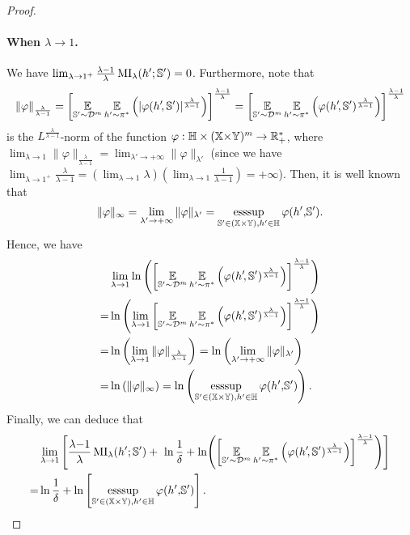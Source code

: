 \begin{noaddcontents}
\begin{proof}
\paragraph{When $\lambda\rightarrow 1$.} We have  $\lim_{\lambda\rightarrow 1^+}\frac{\lambda{-}1}{\lambda}\operatorname{MI}_{\lambda}(h'; \mathbb{S}') = 0$.
Furthermore, note that 
\begin{align*}
    \|\varphi\|_{\frac{\lambda}{\lambda{-}1}} = \left[\operatorname*{\mathbb{E}}_{\mathbb{S}'{\sim}\mathcal{D}^{m}}\operatorname*{\mathbb{E}}_{h'{\sim}\pi^*}\left(\vert\varphi(h'\!, \mathbb{S}')\vert^{\frac{\lambda}{\lambda{-}1}}\right)\right]^{\frac{\lambda{-}1}{\lambda}} = \left[\operatorname*{\mathbb{E}}_{\mathbb{S}'{\sim}\mathcal{D}^{m}}\operatorname*{\mathbb{E}}_{h'{\sim}\pi^*}\left(\varphi(h'\!, \mathbb{S}')^{\frac{\lambda}{\lambda{-}1}}\right)\right]^{\frac{\lambda{-}1}{\lambda}}
\end{align*}
is the $L^{\frac{\lambda}{\lambda{-}1}}$-norm of the function $\varphi: \mathbb{H}\times(\mathbb{X}{\times}\mathbb{Y})^m \rightarrow \mathbb{R}_{+}^*$, where $\lim_{\lambda\rightarrow 1} \|\varphi\|_{\frac{\lambda}{\lambda{-}1}} = \lim_{\lambda'\rightarrow +\infty} \|\varphi\|_{\lambda'}$ (since we have $\lim_{\lambda\rightarrow 1^+}\frac{\lambda}{\lambda{-}1} = (\lim_{\lambda\rightarrow1}\lambda)(\lim_{\lambda\rightarrow1}\frac{1}{\lambda{-}1}) = +\infty$).
Then, it is well known that
\begin{align*}
    \|\varphi\|_{\infty}= \lim_{\lambda'\rightarrow+\infty}\|\varphi\|_{\lambda'} = \operatorname*{\text{\rm esssup}}_{\mathbb{S}'\in(\mathbb{X}{\times}\mathbb{Y}), h'\in\mathbb{H}}\varphi(h'{,} \mathbb{S}').
\end{align*}
Hence, we have 
\begin{align*}
    &\lim_{\lambda\rightarrow1} \ln\left(\left[\operatorname*{\mathbb{E}}_{\mathbb{S}'{\sim}\mathcal{D}^{m}}\operatorname*{\mathbb{E}}_{h'{\sim}\pi^*}\left(\varphi(h'\!, \mathbb{S}')^{\frac{\lambda}{\lambda{-}1}}\right)\right]^{\frac{\lambda{-}1}{\lambda}}\right)\\
    = &\ln\left( \lim_{\lambda\rightarrow1} \left[\operatorname*{\mathbb{E}}_{\mathbb{S}'{\sim}\mathcal{D}^{m}}\operatorname*{\mathbb{E}}_{h'{\sim}\pi^*}\left(\varphi(h'\!, \mathbb{S}')^{\frac{\lambda}{\lambda{-}1}}\right)\right]^{\frac{\lambda{-}1}{\lambda}}\right)\\
    = &\ln\left( \lim_{\lambda\rightarrow1} \| \varphi\|_{\frac{\lambda}{\lambda-1}}\right) = \ln\left( \lim_{\lambda'\rightarrow+\infty} \| \varphi\|_{\lambda'}\right) \\
    = &\ln\left( \| \varphi\|_{\infty}\right) = \ln\left( \operatorname*{\text{\rm esssup}}_{\mathbb{S}'\in(\mathbb{X}{\times}\mathbb{Y}), h'\in\mathbb{H}}\varphi(h'{,} \mathbb{S}') \right).
\end{align*}
Finally, we can deduce that 
\begin{align*}
    &\lim_{\lambda\rightarrow 1}\LB \frac{\lambda{-}1}{\lambda}\MI_{\lambda}(\h'; \S') +\ \ln\frac{1}{\delta} + \ln\!\LP\LB\EE_{\S'{\sim}\D^{\m}}\EE_{\h'{\sim} \P^*}\LP\varphi(\h'\!, \S')^{\frac{\lambda}{\lambda-1}}\RP\RB^{\frac{\lambda{-}1}{\lambda}}\RP\RB\\
    = &\ln\frac{1}{\delta} + \ln\left[\esssup_{\S'\in(\X{\times}\Y), \h'\in\H}\varphi(\h'{,} \S')\right].\\
\end{align*}


\end{proof}
\end{noaddcontents}
